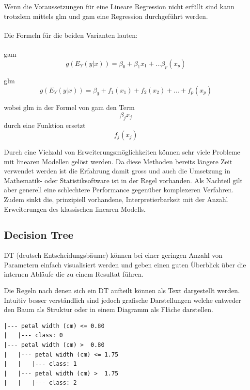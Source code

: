 \documentclass[
  12pt, %
  a4paper, %
  oneside, %
  openany, 
  numbers=noenddot, %
  BCOR=5mm, %
  parskip=half*, %
  thesis, %
]{bfhbook}
\begin{document}
\begin{center}
\begin{minipage}[t]{0.3\linewidth}
\end{minipage}\hfill
\begin{minipage}[t]{0.55\linewidth}
\vspace{0pt}
Wenn die Voraussetzungen für eine Lineare Regression nicht erfüllt sind kann trotzdem mittels \Gls{glm} und \Gls{gam} eine Regression durchgeführt werden.
\\\\
Die Formeln für die beiden Varianten lauten:
\\\\
\acrshort{gam} \[g(E_Y(y|x))=\beta_0+\beta_1x_1+…\beta_p(x_p)\]

\acrshort{glm} \[g(E_Y(y|x))=\beta_0+f_1(x_1)+f_2(x_2)+…+f_p(x_p)\]

wobei \acrshort{glm} in der Formel von \acrshort{gam} den Term \[\beta_jx_j\] durch eine Funktion ersetzt \[f_j(x_j)\]
\end{minipage}
\end{center}
Durch eine Vielzahl von Erweiterungsmöglichkeiten können sehr viele Probleme mit linearen Modellen gelöst werden. Da diese Methoden bereits längere Zeit verwendet werden ist die Erfahrung damit gross und auch die Umsetzung in Mathematik- oder Statistiksoftware ist in der Regel vorhanden. Als Nachteil gilt aber generell eine schlechtere Performance gegenüber komplexeren Verfahren. Zudem sinkt die, prinzipiell vorhandene, Interpretierbarkeit mit der Anzahl Erweiterungen des klassischen linearen Modells.

\subsection{Decision Tree}
\label{DT}
\Gls{DT} (deutsch Entscheidungsbäume) können bei einer geringen Anzahl von Parametern einfach visualisiert werden und geben einen guten Überblick über die internen Abläufe die zu einem Resultat führen.
\begin{center}
\begin{minipage}[t]{0.45\linewidth}
\vspace{10pt}
Die Regeln nach denen sich ein \Gls{DT} aufteilt können als Text dargestellt werden. Intuitiv besser verständlich sind jedoch grafische Darstellungen welche entweder den Baum als Struktur oder in einem Diagramm als Fläche darstellen.
\end{minipage}\hfill
\begin{minipage}[t]{0.45\linewidth}
\begin{lstlisting}
|--- petal width (cm) <= 0.80
|   |--- class: 0
|--- petal width (cm) >  0.80
|   |--- petal width (cm) <= 1.75
|   |   |--- class: 1
|   |--- petal width (cm) >  1.75
|   |   |--- class: 2
\end{lstlisting}
\end{minipage}
\end{center}
\end{document}
